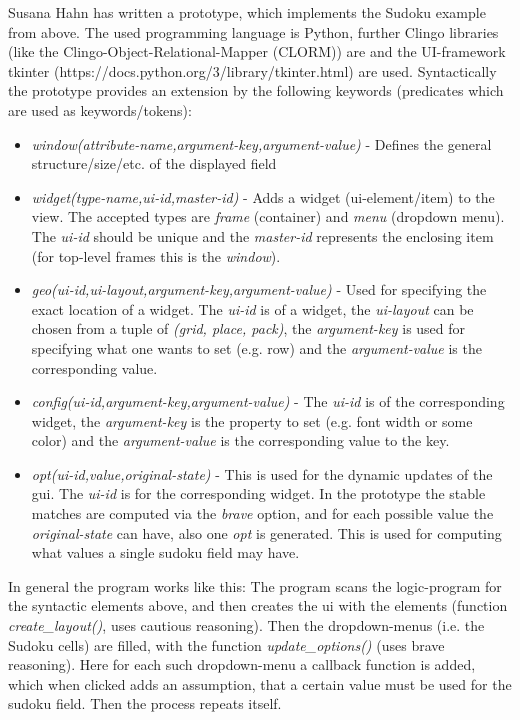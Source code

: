 \documentclass[12pt,a4paper]{article}
\newcommand{\<}[1]{\guilsinglleft}
\renewcommand{\>}[1]{\guilsinglright}
\begin{document}
\noindent Susana Hahn has written a prototype, which implements the Sudoku example from above. The used programming language is Python, further Clingo libraries (like the Clingo-Object-Relational-Mapper (CLORM)) are and the UI-framework tkinter (https://docs.python.org/3/library/tkinter.html) are used. Syntactically the prototype provides an extension by the following keywords (predicates which are used as keywords/tokens):

\begin{itemize}
    \item \textit{window(\< aattribute-name\> ,,\< aargument-key\>,,\<aargument-value\>))} - Defines the general structure/size/etc. of the displayed field
    \item \textit{widget(\< ttype-name\>,,\<uui-id\>,,\<mmaster-id\>))} - Adds a widget (ui-element/item) to the view. The accepted types are \textit{frame} (container) and \textit{menu} (dropdown menu). The \textit{ui-id} should be unique and the \textit{master-id} represents the enclosing item (for top-level frames this is the \textit{window}).
    \item \textit{geo(\<uui-id\>,,\<uui-layout\>,,\<aargument-key\>,,\<aargument-value\>))} - Used for specifying the exact location of a widget. The \textit{ui-id} is of a widget, the \textit{ui-layout} can be chosen from a tuple of \textit{(grid, place, pack)}, the \textit{argument-key} is used for specifying what one wants to set (e.g. row) and the \textit{argument-value} is the corresponding value.
    \item \textit{config(\<uui-id\>,,\<aargument-key\>,,\<aargument-value\>))} - The \textit{ui-id} is of the corresponding widget, the \textit{argument-key} is the property to set (e.g. font width or some color) and the \textit{argument-value} is the corresponding value to the key.
    \item \textit{opt(\<uui-id\>,,\<vvalue\>,,\<ooriginal-state\>))} - This is used for the dynamic updates of the gui. The \textit{ui-id} is for the corresponding widget. In the prototype the stable matches are computed via the \textit{brave} option, and for each possible value the \textit{original-state} can have, also one \textit{opt} is generated. This is used for computing what values a single sudoku field may have.
\end{itemize}

\noindent In general the program works like this: The program scans the logic-program for the syntactic elements above, and then creates the ui with the elements (function \textit{create\_layout()}, uses cautious reasoning). Then the dropdown-menus (i.e. the Sudoku cells) are filled, with the function \textit{update\_options()} (uses brave reasoning). Here for each such dropdown-menu a callback function is added, which when clicked adds an assumption, that a certain value must be used for the sudoku field. Then the process repeats itself.
\end{document}
